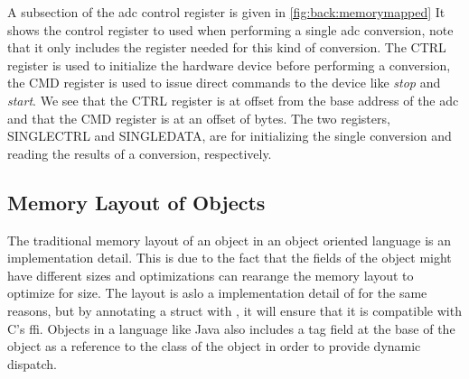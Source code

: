 A subsection of the \gls{adc} control register is given in \autoref{fig:back:memorymapped}
It shows the control register to used when performing a single \gls{adc} conversion, note that it only includes the register needed for this kind of conversion.
The CTRL register is used to initialize the hardware device before performing a conversion, the CMD register is used to issue direct commands to the device like \emph{stop} and \emph{start}.
We see that the CTRL register is at offset  from the base address of the \gls{adc} and that the CMD register is at an offset of  bytes.
The two registers, SINGLECTRL and SINGLEDATA, are for initializing the single conversion and reading the results of a conversion, respectively.

\subsection{Memory Layout of Objects}

The traditional memory layout of an object in an object oriented language is an implementation detail.
This is due to the fact that the fields of the object might have different sizes and optimizations can rearange the memory layout to optimize for size.
The layout is aslo a implementation detail of \rust for the same reasons, but by annotating a struct with \attrib{\#[repr(C)]}, it will ensure that it is compatible with C's \gls{ffi}.
Objects in a language like Java also includes a tag field at the base of the object as a reference to the class of the object in order to provide dynamic dispatch.

